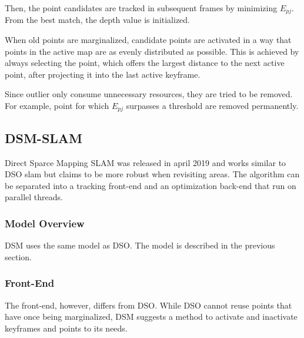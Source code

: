 \begin{enumerate}
	Then, the point candidates are tracked in subsequent frames by minimizing $E_{pj}$. From the best match, the depth value is initialized. 
	
	When old points are marginalized, candidate points are activated in a way that points in the active map are as evenly distributed 
	as possible. This is achieved by always selecting the point, which offers the largest distance to the next active point, after projecting
	it into the last active keyframe. 
	
	Since outlier only consume unnecessary resources, they are tried to be removed. For example, point for which $E_{pj}$ surpasses a threshold 
	are removed permanently. 
	
	\end{enumerate}

	\subsection{DSM-SLAM}
	
	Direct Sparce Mapping SLAM was released in april 2019 and works similar to DSO slam but claims to be more robust when revisiting 
	areas. The algorithm can be separated into a tracking 
	front-end and an optimization back-end that run on parallel threads. 
	
	\subsubsection{Model Overview}
	
		DSM uses the same model as DSO. The model is described in the previous section.
	
	\subsubsection{Front-End}
	
	The front-end, however, differs from DSO. While DSO cannot reuse points that have once being marginalized, DSM suggests a method 
	to activate and inactivate keyframes and points to its needs. 
	
